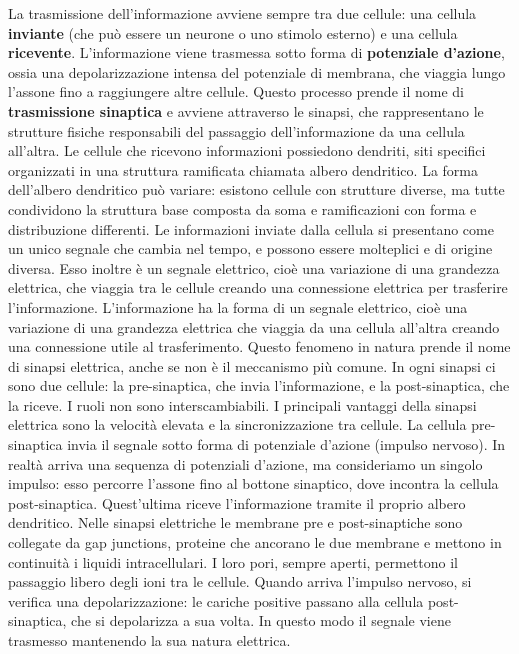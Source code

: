 \documentclass[12pt,a4paper,openany]{book}
\begin{document}
La trasmissione dell’informazione avviene sempre tra due cellule: una cellula \textbf{inviante} (che può essere un neurone o uno stimolo esterno) e una cellula \textbf{ricevente}. L’informazione viene trasmessa sotto forma di \textbf{potenziale d’azione}, ossia una depolarizzazione intensa del potenziale di membrana, che viaggia lungo l’assone fino a raggiungere altre cellule. Questo processo prende il nome di \textbf{trasmissione sinaptica} e avviene attraverso le sinapsi, che rappresentano le strutture fisiche responsabili del passaggio dell’informazione da una cellula all’altra.
Le cellule che ricevono informazioni possiedono dendriti, siti specifici organizzati in una struttura ramificata chiamata albero dendritico. La forma dell’albero dendritico può variare: esistono cellule con strutture diverse, ma tutte condividono la struttura base composta da soma e ramificazioni con forma e distribuzione differenti. Le informazioni inviate dalla cellula si presentano come un unico segnale che cambia nel tempo, e possono essere molteplici e di origine diversa. Esso inoltre è un segnale elettrico, cioè una variazione di una grandezza elettrica, che viaggia tra le cellule creando una connessione elettrica per trasferire l’informazione. L’informazione ha la forma di un segnale elettrico, cioè una variazione di una grandezza elettrica che viaggia da una cellula all’altra creando una connessione utile al trasferimento. Questo fenomeno in natura prende il nome di sinapsi elettrica, anche se non è il meccanismo più comune. In ogni sinapsi ci sono due cellule: la pre-sinaptica, che invia l’informazione, e la post-sinaptica, che la riceve. I ruoli non sono interscambiabili. I principali vantaggi della sinapsi elettrica sono la velocità elevata e la sincronizzazione tra cellule.
La cellula pre-sinaptica invia il segnale sotto forma di potenziale d’azione (impulso nervoso). In realtà arriva una sequenza di potenziali d’azione, ma consideriamo un singolo impulso: esso percorre l’assone fino al bottone sinaptico, dove incontra la cellula post-sinaptica. Quest’ultima riceve l’informazione tramite il proprio albero dendritico. Nelle sinapsi elettriche le membrane pre e post-sinaptiche sono collegate da gap junctions, proteine che ancorano le due membrane e mettono in continuità i liquidi intracellulari. I loro pori, sempre aperti, permettono il passaggio libero degli ioni tra le cellule. Quando arriva l’impulso nervoso, si verifica una depolarizzazione: le cariche positive passano alla cellula post-sinaptica, che si depolarizza a sua volta. In questo modo il segnale viene trasmesso mantenendo la sua natura elettrica.
\end{document}

